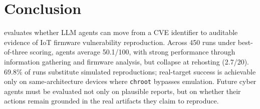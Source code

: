 \section{Conclusion}
\sys{} evaluates whether LLM agents can move from a CVE identifier to auditable evidence of IoT firmware vulnerability reproduction. Across 450 runs under best-of-three scoring, agents average 50.1/100, with strong performance through information gathering and firmware analysis, but collapse at rehosting (2.7/20). 69.8\% of runs substitute simulated reproductions; real-target success is achievable only on same-architecture devices where \texttt{chroot} bypasses emulation. Future cyber agents must be evaluated not only on plausible reports, but on whether their actions remain grounded in the real artifacts they claim to reproduce.
